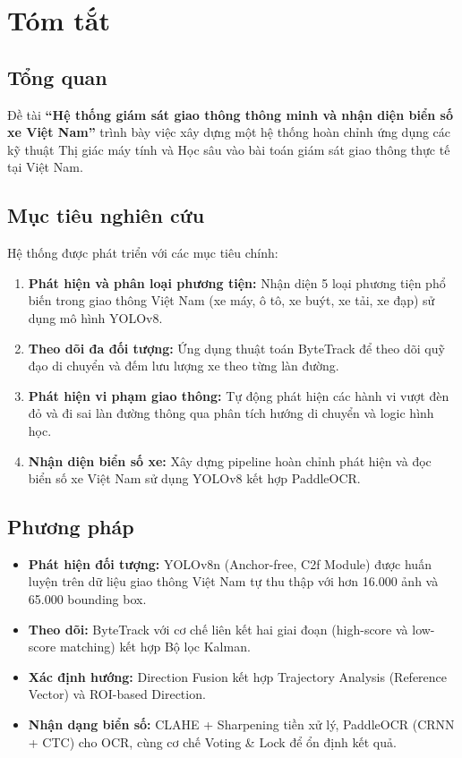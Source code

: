 \chapter*{Tóm tắt}

\section*{Tổng quan}
Đề tài \textbf{``Hệ thống giám sát giao thông thông minh và nhận diện biển số xe Việt Nam''} trình bày việc xây dựng một hệ thống hoàn chỉnh ứng dụng các kỹ thuật Thị giác máy tính và Học sâu vào bài toán giám sát giao thông thực tế tại Việt Nam.

\section*{Mục tiêu nghiên cứu}
Hệ thống được phát triển với các mục tiêu chính:
\begin{enumerate}
    \item \textbf{Phát hiện và phân loại phương tiện:} Nhận diện 5 loại phương tiện phổ biến trong giao thông Việt Nam (xe máy, ô tô, xe buýt, xe tải, xe đạp) sử dụng mô hình YOLOv8.
    \item \textbf{Theo dõi đa đối tượng:} Ứng dụng thuật toán ByteTrack để theo dõi quỹ đạo di chuyển và đếm lưu lượng xe theo từng làn đường.
    \item \textbf{Phát hiện vi phạm giao thông:} Tự động phát hiện các hành vi vượt đèn đỏ và đi sai làn đường thông qua phân tích hướng di chuyển và logic hình học.
    \item \textbf{Nhận diện biển số xe:} Xây dựng pipeline hoàn chỉnh phát hiện và đọc biển số xe Việt Nam sử dụng YOLOv8 kết hợp PaddleOCR.
\end{enumerate}

\section*{Phương pháp}
\begin{itemize}
    \item \textbf{Phát hiện đối tượng:} YOLOv8n (Anchor-free, C2f Module) được huấn luyện trên dữ liệu giao thông Việt Nam tự thu thập với hơn 16.000 ảnh và 65.000 bounding box.
    \item \textbf{Theo dõi:} ByteTrack với cơ chế liên kết hai giai đoạn (high-score và low-score matching) kết hợp Bộ lọc Kalman.
    \item \textbf{Xác định hướng:} Direction Fusion kết hợp Trajectory Analysis (Reference Vector) và ROI-based Direction.
    \item \textbf{Nhận dạng biển số:} CLAHE + Sharpening tiền xử lý, PaddleOCR (CRNN + CTC) cho OCR, cùng cơ chế Voting \& Lock để ổn định kết quả.
\end{itemize}


